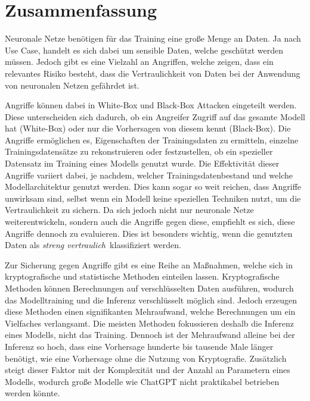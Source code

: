 \chapter{Zusammenfassung}

Neuronale Netze benötigen für das Training eine große Menge an Daten.
Ja nach Use Case, handelt es sich dabei um sensible Daten, welche geschützt werden müssen.
Jedoch gibt es eine Vielzahl an Angriffen, welche zeigen, dass ein relevantes Risiko besteht, dass die Vertraulichkeit von Daten bei der Anwendung von neuronalen Netzen gefährdet ist.

Angriffe können dabei in White-Box und Black-Box Attacken eingeteilt werden. 
Diese unterscheiden sich dadurch, ob ein Angreifer Zugriff auf das gesamte Modell hat (White-Box) oder nur die Vorhersagen von diesem kennt (Black-Box).
Die Angriffe ermöglichen es, Eigenschaften der Trainingsdaten zu ermitteln, einzelne Trainingsdatensätze zu rekonstruieren oder festzustellen, ob ein spezieller Datensatz im Training eines Modells genutzt wurde.
Die Effektivität dieser Angriffe variiert dabei, je nachdem, welcher Trainingsdatenbestand und welche Modellarchitektur genutzt werden.
Dies kann sogar so weit reichen, dass Angriffe unwirksam sind, selbst wenn ein Modell keine speziellen Techniken nutzt, um die Vertraulichkeit zu sichern.
Da sich jedoch nicht nur neuronale Netze weiterentwickeln, sondern auch die Angriffe gegen diese, empfiehlt es sich, diese Angriffe dennoch zu evaluieren.
Dies ist besonders wichtig, wenn die genutzten Daten als \dq\textit{streng vertraulich}\dq\ klassifiziert werden.

Zur Sicherung gegen Angriffe gibt es eine Reihe an Maßnahmen, welche sich in kryptografische und statistische Methoden einteilen lassen.
Kryptografische Methoden können Berechnungen auf verschlüsselten Daten ausführen, wodurch das Modelltraining und die Inferenz verschlüsselt möglich sind.
Jedoch erzeugen diese Methoden einen signifikanten Mehraufwand, welche Berechnungen um ein Vielfaches verlangsamt.
Die meisten Methoden fokussieren deshalb die Inferenz eines Modells, nicht das Training.
Dennoch ist der Mehraufwand alleine bei der Inferenz so hoch, dass eine Vorhersage hunderte bis tausende Male länger benötigt, wie eine Vorhersage ohne die Nutzung von Kryptografie.
Zusätzlich steigt dieser Faktor mit der Komplexität und der Anzahl an Parametern eines Modells, wodurch große Modelle wie ChatGPT nicht praktikabel betrieben werden könnte.

